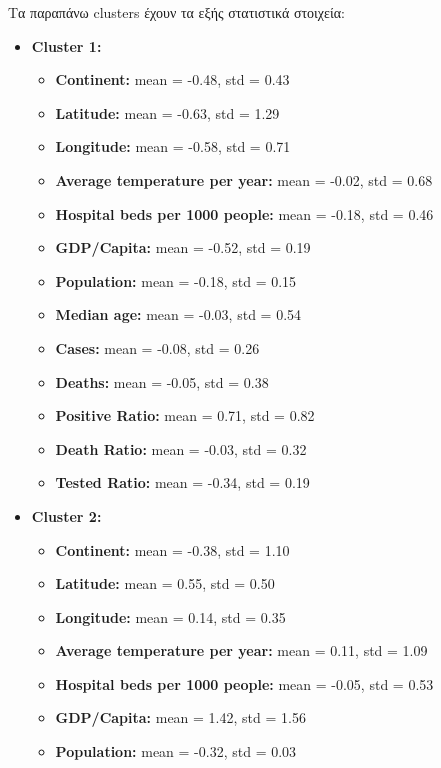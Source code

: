 \documentclass[12pt,a4paper]{article}
\begin{document}
Τα παραπάνω clusters έχουν τα εξής στατιστικά στοιχεία:

\begin{itemize}
    \item \textbf{Cluster 1:}
        \begin{itemize}
            \item \textbf{Continent:} mean = -0.48, std = 0.43
            \item \textbf{Latitude:} mean = -0.63, std = 1.29
            \item \textbf{Longitude:} mean = -0.58, std = 0.71
            \item \textbf{Average temperature per year:} mean = -0.02, std = 0.68
            \item \textbf{Hospital beds per 1000 people:} mean = -0.18, std = 0.46
            \item \textbf{GDP/Capita:} mean = -0.52, std = 0.19
            \item \textbf{Population:} mean = -0.18, std = 0.15
            \item \textbf{Median age:} mean = -0.03, std = 0.54
            \item \textbf{Cases:} mean = -0.08, std = 0.26
            \item \textbf{Deaths:} mean = -0.05, std = 0.38
            \item \textbf{Positive Ratio:} mean = 0.71, std = 0.82
            \item \textbf{Death Ratio:} mean = -0.03, std = 0.32
            \item \textbf{Tested Ratio:} mean = -0.34, std = 0.19
        \end{itemize}
    \item \textbf{Cluster 2:}
        \begin{itemize}
            \item \textbf{Continent:} mean = -0.38, std = 1.10
            \item \textbf{Latitude:} mean = 0.55, std = 0.50
            \item \textbf{Longitude:} mean = 0.14, std = 0.35
            \item \textbf{Average temperature per year:} mean = 0.11, std = 1.09
            \item \textbf{Hospital beds per 1000 people:} mean = -0.05, std = 0.53
            \item \textbf{GDP/Capita:} mean = 1.42, std = 1.56
            \item \textbf{Population:} mean = -0.32, std = 0.03

\end{itemize}
\end{itemize}
\end{document}
